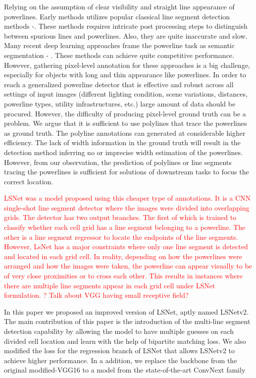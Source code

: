 \documentclass[journal]{IEEEtran}
\begin{document}
Relying on the assumption of clear visibility and straight line appearance of powerlines. Early methods utilizes popular classical line segment detection methods \cite{} -\cite{}. These methods requires intricate post processing steps to distinguish between spurious lines and powerlines. Also, they are quite inaccurate and slow. Many recent deep learning approaches frame the powerline task as semantic segmentation \cite{} - \cite{}. These methods can achieve quite competitive performance. However, gathering pixel-level annotation for these approaches is a big challenge, especially for objects with long and thin appearance like powerlines. In order to reach a generalized powerline detector that is effective and robust across all settings of input images (different lighting condition, scene variations, distances, powerline types, utility infrastructures, etc.) large amount of data should be procured. However, the difficulty of producing pixel-level ground truth can be a problem. We argue that it is sufficient to use polylines that trace the powerlines as ground truth. The polyline annotations can generated at considerable higher efficiency. The lack of width information in the ground truth will result in the detection method inferring no or imprecise width estimation of the powerlines. However, from our observation, the prediction of polylines or line segments tracing the powerlines is sufficient for solutions of downstream tasks to focus the correct location.

\textcolor{red}{LSNet \cite{Nguyen2020} was a model proposed using this cheaper type of annotations. It is a CNN single-shot line segment detector where the images were divided into overlapping grids. The detector has two output branches. The first of which is trained to classify whether each cell grid has a line segment belonging to a powerline. The other is a line
segment regressor to locate the endpoints of the line segments. However, LsNet has a major constraints where only one line segment is detected and located in each grid cell. In reality, depending on how the powerlines were arranged and how the images were taken, the powerline can appear visually to be of very close proximities or to cross each other. This results in instances where there are multiple line segments appear in each grid cell under LSNet formulation. ? Talk about VGG having small receptive field?}

In this paper we proposed an improved version of LSNet, aptly named LSNetv2. The main contribution of this paper is the introduction of the multi-line segment detection capability by allowing the model to have multiple guesses on each divided cell location and learn with the help of bipartite matching loss. We also modified the loss for the regression branch of LSNet that allows LSNetv2 to achieve higher performance. In a addition, we replace the backbone from the original modified-VGG16 \cite{vgg} to a model from the state-of-the-art ConvNext family \cite{convnext}
\end{document}
